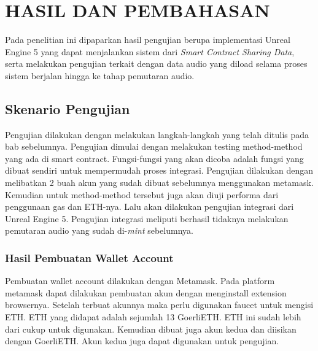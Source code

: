 \chapter{HASIL DAN PEMBAHASAN}
\label{chap:hasildanpembahasan}



Pada penelitian ini dipaparkan hasil pengujian berupa implementasi Unreal Engine 5 yang dapat menjalankan sistem dari \emph{Smart Contract Sharing Data}, serta melakukan pengujian terkait
dengan data audio yang diload selama proses sistem berjalan hingga ke tahap pemutaran audio.

\section{Skenario Pengujian}
Pengujian dilakukan dengan melakukan langkah-langkah yang telah ditulis pada bab sebelumnya. Pengujian dimulai dengan melakukan testing method-method yang ada di smart contract.
Fungsi-fungsi yang akan dicoba adalah fungsi yang dibuat sendiri untuk mempermudah proses integrasi. Pengujian dilakukan dengan melibatkan 2 buah akun yang sudah dibuat sebelumnya
menggunakan metamask. Kemudian untuk method-method tersebut juga akan diuji performa dari penggunaan gas dan ETH-nya. Lalu akan dilakukan pengujian integrasi dari Unreal Engine 5.
Pengujian integrasi meliputi berhasil tidaknya melakukan pemutaran audio yang sudah di-\emph{mint} sebelumnya.

\subsection{Hasil Pembuatan Wallet Account}
Pembuatan wallet account dilakukan dengan Metamask. Pada platform metamask dapat dilakukan pembuatan akun dengan menginstall extension browsernya. Setelah terbuat akunnya maka perlu
digunakan faucet untuk mengisi ETH. ETH yang didapat adalah sejumlah 13 GoerliETH. ETH ini sudah lebih dari cukup untuk digunakan. Kemudian dibuat juga akun kedua dan diisikan dengan GoerliETH.
Akun kedua juga dapat digunakan untuk pengujian.


